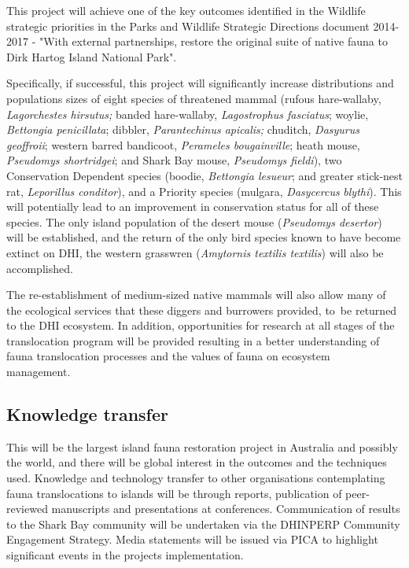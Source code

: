 \documentclass[version=last,
    paper=a4,                               %
    10pt,                                   %
    dvipsnames,
    oneside,                              %
    headings=openany,                       %
    open=any,
    BCOR=7mm,                               %
    DIV=15,     %
]{scrbook}
\begin{document}
This project will achieve one of the key outcomes identified in the
Wildlife strategic priorities in the Parks and Wildlife Strategic
Directions document 2014-2017 - "With external partnerships, restore the
original suite of native fauna to Dirk Hartog Island National Park".

Specifically, if successful, this project will significantly increase
distributions and populations sizes of eight species of threatened
mammal (rufous hare-wallaby, \emph{Lagorchestes hirsutus;} banded
hare-wallaby, \emph{Lagostrophus fasciatus}; woylie, \emph{Bettongia
penicillata}; dibbler, \emph{Parantechinus apicalis;} chuditch,
\emph{Dasyurus geoffroii}; western barred bandicoot, \emph{Perameles
bougainville}; heath mouse, \emph{Pseudomys shortridgei}; and Shark Bay
mouse, \emph{Pseudomys fieldi}), two Conservation Dependent species
(boodie, \emph{Bettongia lesueur}; and greater stick-nest rat,
\emph{Leporillus conditor}), and a Priority species (mulgara,
\emph{Dasycercus} \emph{blythi}). This will potentially lead to an
improvement in conservation status for all of these species. The only
island population of the desert mouse (\emph{Pseudomys desertor}) will
be established, and the return of the only bird species known to have
become extinct on DHI, the western grasswren (\emph{Amytornis textilis
textilis}) will also be accomplished.

The re-establishment of medium-sized native mammals will also allow many
of the ecological services that these diggers and burrowers provided,
to~be returned to the DHI ecosystem. In addition, opportunities for
research at all stages of the translocation program will be provided
resulting in a better understanding of fauna translocation processes and
the values of fauna on ecosystem management.~




\subsection*{Knowledge transfer}

This will be the largest island fauna restoration project in Australia
and possibly the world, and there will be global interest in the
outcomes and the techniques used. Knowledge and technology transfer to
other organisations contemplating fauna translocations to islands will
be through reports, publication of peer-reviewed manuscripts and
presentations at conferences. Communication of results to the Shark Bay
community will be undertaken via the DHINPERP Community Engagement
Strategy. Media statements will be issued via PICA to highlight
significant events in the projects implementation.
\end{document}
